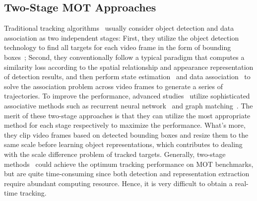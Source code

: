 \documentclass[acmsmall]{acmart}
\begin{document}
\subsection{Two-Stage MOT Approaches}
Traditional tracking algorithms~\cite{deep_sort,mahmoudi2019multi,zhou2018online,poi} usually consider object detection and data association as two independent stages: 
{First, they utilize the object detection technology to find all targets for each video frame in the form of bounding boxes~\cite{he2017mask,redmon2018yolov3,luo2020strong}}; 
Second, they conventionally follow a typical paradigm that computes a similarity loss according to the spatial relationship and appearance representation of detection results, 
and then perform state estimation~\cite{welch1995introduction,multi_pattern,weight_sparse,local_sparse,RN1215} and data association~\cite{kuhn1955hungarian,zhou2018online} to solve the association problem across video frames to generate a series of trajectories. 
To improve the performance, advanced studies~\cite{mahmoudi2019multi} utilize sophisticated associative methods such as recurrent neural network~\cite{fang2018recurrent} and graph matching~\cite{zhou2018online}. 
%
The merit of these two-stage approaches is that they can utilize the most appropriate method for each stage respectively to maximize the performance. 
What's more, they clip video frames based on detected bounding boxes and resize them to the same scale before learning object representations, 
which contributes to dealing with the scale difference problem of tracked targets. 
Generally, two-stage methods~\cite{poi} could achieve the optimum tracking performance on MOT benchmarks, 
but are quite time-consuming since both detection and representation extraction require abundant computing resource. 
Hence, it is very difficult to obtain a real-time tracking.

\end{document}
